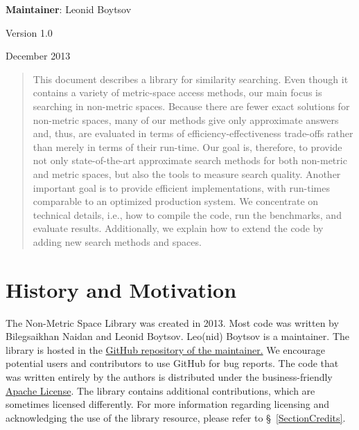 \documentclass[runningheads,a4paper]{llncs}
\begin{document}
{\begin{center}{\small \textbf{Maintainer}: Leonid Boytsov}\end{center}}
{\begin{center}{Version 1.0}\end{center} 
{\begin{center}{December 2013}\end{center}}

\begin{abstract}
This document describes a library for similarity searching.
Even though it contains a variety of metric-space access methods,
our main focus is searching in non-metric spaces.
Because there are fewer exact solutions for non-metric spaces,
many of our methods give only approximate answers and, thus,
are evaluated in terms of efficiency-effectiveness trade-offs
rather than merely in terms of their run-time.
Our goal is, therefore, to provide
not only state-of-the-art approximate search methods for 
both non-metric and metric spaces,
but also the tools to measure search quality.
Another important goal is to provide efficient implementations,
with run-times comparable to an optimized production system. 
We concentrate on technical details, i.e., 
how to compile the code, run the benchmarks, and evaluate results.
Additionally, we explain how to extend the code by adding
new search methods and spaces.
\end{abstract}

\section{History and Motivation}
The Non-Metric Space Library was created in 2013.
Most code was written by Bilegsaikhan Naidan and Leonid Boytsov.
Leo(nid) Boytsov is a maintainer.
The library is hosted in the \href{https://github.com/searchivarius/NonMetricSpaceLib}{GitHub repository of  the maintainer.} 
We encourage potential users and contributors to use GitHub for bug reports.
The code that was written entirely by the authors is distributed under the business-friendly \href{http://apache.org/licenses/LICENSE-2.0}{Apache License}. 
The library contains additional contributions, which are sometimes licensed differently.
For more information regarding licensing and acknowledging the use of the library
resource, please refer to \S~\ref{SectionCredits}.

}
\end{document}
